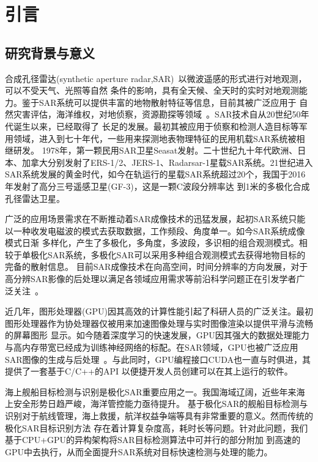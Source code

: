 \chapter{引言}
\label{cha:intro}

\section{研究背景与意义}
合成孔径雷达(synthetic aperture radar,SAR)~\cite{Knight2018Synthetic}以微波遥感的形式进行对地观测，可以不受天气、光照等自然
条件的影响，具有全天候、全天时的实时对地观测能力。鉴于SAR系统可以提供丰富的地物散射特征等信息，目前其被广泛应用于
自然灾害评估，海洋维权，对地侦察，资源勘探等领域~\cite{Moreira2013A}。SAR技术自从20世纪50年代诞生以来，已经取得了
长足的发展。最初其被应用于侦察和检测人造目标等军用领域，进入到七十年代，一些用来探测地表物理特征的民用机载SAR系统被相继研发。
1978年，第一颗民用SAR卫星Seasat发射。二十世纪九十年代欧洲、日本、加拿大分别发射了ERS-1/2、JERS-1、Radarsar-1星载SAR系统。21世纪进入
SAR系统发展的黄金时代，如今在轨运行的星载SAR系统超过20个，我国于2016年发射了高分三号遥感卫星(GF-3)，这是一颗C波段分辨率达
到1米的多极化合成孔径雷达卫星。

广泛的应用场景需求在不断推动着SAR成像技术的迅猛发展，起初SAR系统只能以一种收发电磁波的模式去获取数据，工作频段、角度单一。如今SAR系统成像模式日渐
多样化，产生了多极化，多角度，多波段，多识相的组合观测模式。相较于单极化SAR系统，多极化SAR可以采用多种组合观测模式去获得地物目标的完备的散射信息。
目前SAR成像技术在向高空间，时间分辨率的方向发展，对于高分辨SAR影像的后处理以满足各领域应用需求等前沿科学问题正在引发学者广泛关注~\cite{李德仁2012高分辨率对地观测的若干前沿科学问题}。

近几年，图形处理器(GPU)因其高效的计算性能引起了科研人员的广泛关注。最初图形处理器作为协处理器仅被用来加速图像处理与实时图像渲染以提供平滑与流畅的屏幕图形
显示。如今随着深度学习的快速发展，GPU因其强大的数据处理能力与高内存带宽已经成为训练神经网络的标配。在SAR领域，GPU也被广泛应用SAR图像的生成与后处理~\cite{Jin2012GPU,Liu2009An}。与此同时，GPU编程接口CUDA也一直与时俱进，其提供了一套基于C/C++的API
以便捷开发人员创建可以在其上运行的软件。

海上舰船目标检测与识别是极化SAR重要应用之一。我国海域辽阔，近些年来海上安全形势日趋严峻，海洋管控能力亟待提升。
基于极化SAR的舰船目标检测与识别对于航线管理，海上救援，航洋权益争端等具有非常重要的意义。然而传统的极化SAR目标识别方法
存在着计算复杂度高，耗时长等问题。针对此问题，我们基于CPU+GPU的异构架构将SAR目标检测算法中可并行的部分附加
到高速的GPU中去执行，从而全面提升SAR系统对目标快速检测与处理的能力。


